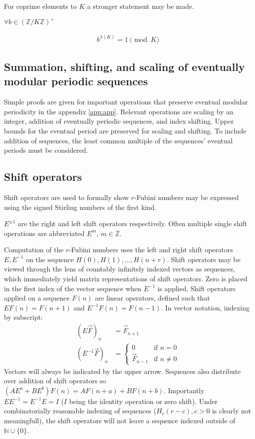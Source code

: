 \documentclass[12pt,reqno]{article}
\begin{document}
For coprime elements to $K$ a stronger statement may be made.
\begin{proposition}
	$\forall b \in (\mathbb{Z}/K\mathbb{Z})^{\times}$

	\begin{align}
		b^{\lambda(K)} = 1 \pmod {K}
	\end{align}
\end{proposition}

\subsection{Summation, shifting, and scaling of eventually modular periodic sequences}\label{subsec:evperioprop}
Simple proofs are given for important operations that preserve eventual modular periodicity in the appendix \ref{app:app}. Relevant operations are scaling by an integer, addition of eventually periodic sequences, and index shifting. Upper bounds for the eventual period are preserved for scaling and shifting. To include addition of sequences, the least common multiple of the sequences' eventual periods must be considered.

\subsection{Shift operators}

Shift operators are used to formally show $r$-Fubini numbers may be expressed using the signed Stirling numbers of the first kind.

\begin{definition}
	$E^{\pm 1}$ are the right and left shift operators respectively. Often multiple single shift operations are abbreviated $E^{m}$, $m \in \mathbb{Z}$.
\end{definition}

Computation of the $r$-Fubini numbers uses the left and right shift operators $E, E^{-1}$ on the sequence $H(0), H(1), \ldots, H(n + r)$. Shift operators may be viewed through the lens of countably infinitely indexed vectors as sequences, which immediately yield matrix representations of shift operators. Zero is placed in the first index of the vector sequence when $E^{-1}$ is applied.
Shift operators applied on a sequence $F(n)$ are linear operators, defined such that $E F(n) = F(n + 1)$ and $E^{-1}F(n) = F(n - 1)$. In vector notation, indexing by subscript:
\begin{align}
	 (E\vec{F})_{n} &= \vec{F}_{n + 1}\\
 (E^{-1}\vec{F})_{n} &= \begin{cases}
 	0  & \text{if } n = 0 \\
 	\vec{F}_{n - 1}  & \text{if } n \neq 0
 \end{cases}
\end{align}
Vectors will always be indicated by the upper arrow. Sequences also distribute over addition of shift operators so $(AE^{a} + BE^{b})F(n) = AF(n + a) + BF(n+b)$. Importantly $EE^{-1} = E^{-1}E = I$ ($I$ being the identity operation or zero shift). Under combinatorially reasonable indexing of sequences ($H_{r}(r - c), c > 0$ is clearly not meaningfull), the shift operators will not leave a sequence indexed outside of $\mathbb{N} \cup \{0\}$.
\end{document}
